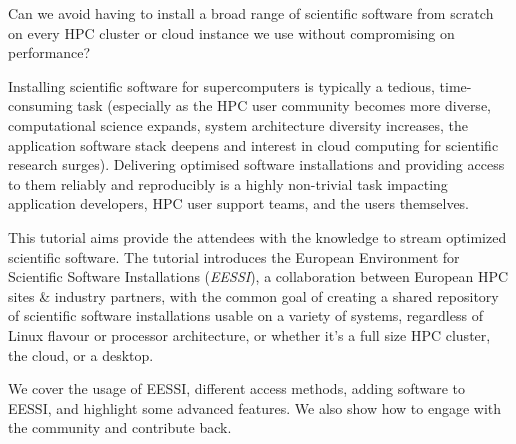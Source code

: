 Can we avoid having to install a broad range of scientific software from scratch on every HPC cluster or
cloud instance we use without compromising on performance?

Installing scientific software for supercomputers is typically a tedious, time-consuming task (especially as the
HPC user community becomes more diverse, computational science expands, system architecture diversity increases, the
application software stack deepens and interest in cloud computing for scientific research surges).
Delivering optimised software installations and providing access to them reliably and reproducibly
is a highly non-trivial task impacting application developers, HPC user support teams, and the users themselves.

This tutorial aims provide the attendees with the knowledge to stream optimized scientific software.
The tutorial introduces the European Environment for Scientific Software Installations (\emph{EESSI}), a collaboration
between European HPC sites & industry partners, with the common goal of creating a shared repository of scientific
software installations usable on a variety of systems, regardless of Linux flavour or processor architecture, or
whether it's a full size HPC cluster, the cloud, or a desktop.

We cover the usage of EESSI, different access methods, adding software to EESSI, and highlight some advanced features.
We also show how to engage with the community and contribute back.

